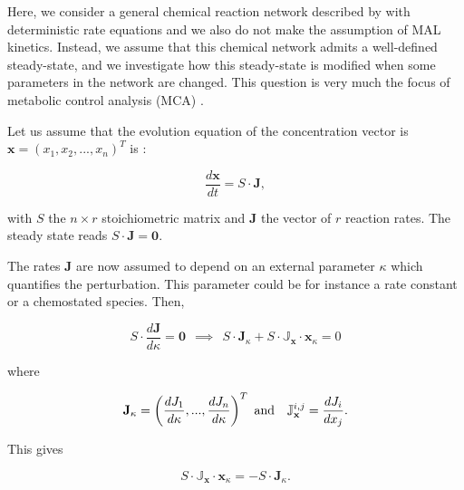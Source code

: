 \documentclass{article}
\begin{document}
	Here, we consider a general chemical reaction network described by with deterministic rate equations and we also do not make the assumption of MAL kinetics. Instead, we assume that this chemical network admits a well-defined steady-state, and we investigate how this steady-state is modified when some parameters in the network are changed. This question is very much the focus of metabolic control analysis (MCA) \cite{3}.
	
	Let us assume that the evolution equation of the concentration vector is $\textbf{x}= (x_1,x_2,...,x_n)^T$ is :
	\begin{center}
		\begin{equation}
			\frac{d\textbf{x}}{dt} = S \cdot \textbf{J},
		\end{equation}
	\end{center}
	with $S$ the $n \times r$ stoichiometric matrix and $\textbf{J}$ the vector of $r$ reaction rates. The steady state reads $S \cdot \textbf{J} = \textbf{0}$.
	
	The rates $\textbf{J}$ are now assumed to depend on an external parameter $\kappa$ which quantifies the perturbation. This parameter could be for instance a rate constant or a chemostated species. Then,
	\begin{center}
		\begin{equation}
			S\cdot \frac{d\mathbf{J}}{d\kappa} = \mathbf{0} \ \ \implies \ \ S \cdot \mathbf{J}_{\kappa} + S \cdot {\mathbb{J}}_{\mathbf{x}} \cdot \mathbf{x}_{\kappa} = 0
		\end{equation}
	\end{center}
	where
	\begin{center}
		\begin{equation}
			\mathbf{J}_{\kappa}= \left(\frac{d J_1}{d\kappa},...,\frac{d J_n}{d\kappa}\right)^T \ {\rm and} \ \ \
			{\mathbb{J}}_{\mathbf{x}}^{i,j} = \frac{d J_i}{d x_j}. 
		\end{equation}
	\end{center}
	
	This gives
	
	\begin{center}
		\begin{equation}
			S \cdot {\mathbb{J}}_{\mathbf{x}} \cdot \mathbf{x}_{\kappa} = - S \cdot \mathbf{J}_{\kappa}.
		\end{equation}
	\end{center}
	
\end{document}
